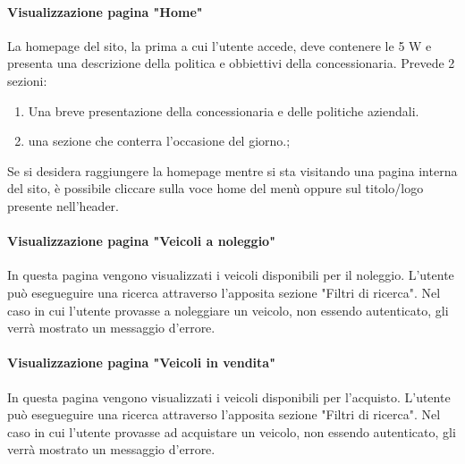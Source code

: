         \paragraph{Visualizzazione pagina "Home"}
        La homepage del sito, la prima a cui l'utente accede, deve contenere le 5 W e presenta una descrizione della politica e obbiettivi della concessionaria.
        Prevede 2 sezioni:
        \begin{enumerate}
            \item Una breve presentazione della concessionaria e delle politiche aziendali. 
            \item una sezione che conterra l'occasione del giorno.;
            \end{enumerate}
        Se si desidera raggiungere la homepage mentre si sta visitando una pagina interna del sito, è possibile cliccare sulla voce home del menù oppure sul titolo/logo presente nell'header.

        \paragraph{Visualizzazione pagina "Veicoli a noleggio"}
        In questa pagina vengono visualizzati i veicoli disponibili per il noleggio. L'utente può esegueguire una ricerca attraverso l'apposita sezione "Filtri di ricerca". Nel caso in cui l'utente provasse a noleggiare un veicolo, non essendo autenticato, gli verrà mostrato un messaggio d'errore.

        \paragraph{Visualizzazione pagina "Veicoli in vendita"}
        In questa pagina vengono visualizzati i veicoli disponibili per l'acquisto. L'utente può esegueguire una ricerca attraverso l'apposita sezione "Filtri di ricerca". Nel caso in cui l'utente provasse ad acquistare un veicolo, non essendo autenticato, gli verrà mostrato un messaggio d'errore.

